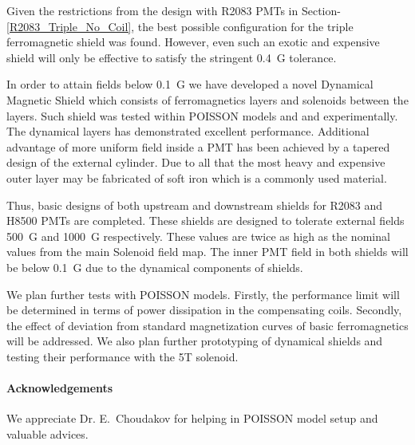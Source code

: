 \documentclass[12pt]{article}
\begin{document}
Given the restrictions from the  design with R2083 PMTs in Section-\ref{R2083_Triple_No_Coil}, 
the best possible configuration for the triple ferromagnetic  shield was found. 
However, even such an exotic and expensive shield 
will only be effective to satisfy the stringent 0.4~G tolerance.

In order to  attain fields below 0.1~G we have developed a novel 
Dynamical Magnetic Shield which consists  of ferromagnetics layers 
and  solenoids  between the layers. 
Such shield was tested within  POISSON models and  
and experimentally.  The dynamical layers  has demonstrated  excellent  performance.   
Additional advantage of more uniform field inside a PMT has been achieved by
a tapered design of the external cylinder. 
Due to  all that  the most heavy and expensive outer layer may be fabricated of soft 
iron which is a commonly used material. 

Thus, basic designs of both upstream and downstream shields for R2083 and
H8500 PMTs are completed. These shields are designed to tolerate 
external fields 500~G and 1000~G respectively. These values are twice as high as the nominal values
from the main Solenoid field map. The inner PMT field in both shields will be below 0.1~G due to 
the dynamical components of shields.
 
We plan further tests with  POISSON models. Firstly, 
the performance limit will be determined in terms of power dissipation in the compensating coils.  
Secondly, the effect of deviation from standard magnetization curves of basic ferromagnetics  will be addressed. 
We also plan further prototyping of  dynamical shields  and testing their performance with the 5T solenoid.

\paragraph{Acknowledgements}We appreciate Dr. E.~Choudakov for helping in   
POISSON model setup  and valuable advices. 
\end{document}
